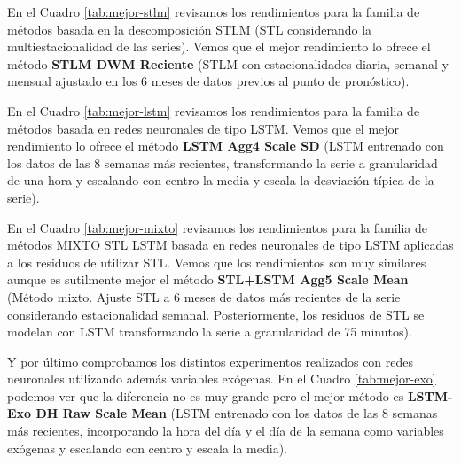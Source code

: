 \documentclass[]{book}
\begin{document}
En el Cuadro \ref{tab:mejor-stlm} revisamos los rendimientos para la
familia de métodos basada en la descomposición STLM (STL considerando la
multiestacionalidad de las series). Vemos que el mejor rendimiento lo
ofrece el método \textbf{STLM DWM Reciente} (STLM con estacionalidades
diaria, semanal y mensual ajustado en los 6 meses de datos previos al
punto de pronóstico).

En el Cuadro \ref{tab:mejor-lstm} revisamos los rendimientos para la
familia de métodos basada en redes neuronales de tipo LSTM. Vemos que el
mejor rendimiento lo ofrece el método \textbf{LSTM Agg4 Scale SD} (LSTM
entrenado con los datos de las 8 semanas más recientes, transformando la
serie a granularidad de una hora y escalando con centro la media y
escala la desviación típica de la serie).

En el Cuadro \ref{tab:mejor-mixto} revisamos los rendimientos para la
familia de métodos MIXTO STL LSTM basada en redes neuronales de tipo
LSTM aplicadas a los residuos de utilizar STL. Vemos que los
rendimientos son muy similares aunque es sutilmente mejor el método
\textbf{STL+LSTM Agg5 Scale Mean} (Método mixto. Ajuste STL a 6 meses de
datos más recientes de la serie considerando estacionalidad semanal.
Posteriormente, los residuos de STL se modelan con LSTM transformando la
serie a granularidad de 75 minutos).

Y por último comprobamos los distintos experimentos realizados con redes
neuronales utilizando además variables exógenas. En el Cuadro
\ref{tab:mejor-exo} podemos ver que la diferencia no es muy grande pero
el mejor método es \textbf{LSTM-Exo DH Raw Scale Mean} (LSTM entrenado
con los datos de las 8 semanas más recientes, incorporando la hora del
día y el día de la semana como variables exógenas y escalando con centro
y escala la media).

\begin{table}[t]

\caption{\label{tab:mejor-arima}RMSE y MAPE para la familia de experimentos basados en ARIMA con horizonte de pronóstico a 1, 4, 12, 24 y 48 horas}
\centering
{}
\end{table}
\end{document}
